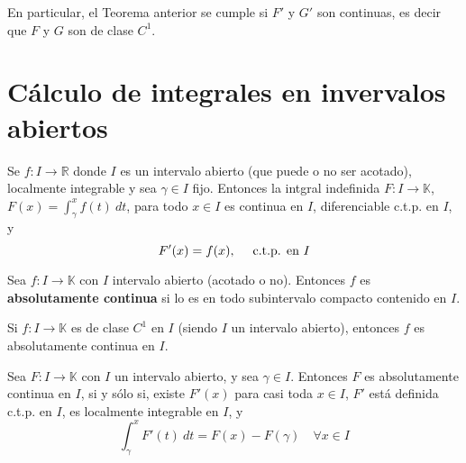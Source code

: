 \documentclass[12pt]{report}
\theoremstyle{largebreak}
\newcommand\cf[3]{\ensuremath{#1:#2\rightarrow#3}}
\begin{document}
	\begin{obs}
		En particular, el Teorema anterior se cumple si $F'$ y $G'$ son continuas, es decir que $F$ y $G$ son de clase $C^1$.
	\end{obs}
	
	\section{Cálculo de integrales en invervalos abiertos}

	\begin{theor}
		Se $\cf{f}{I}{\mathbb{R}}$ donde $I$ es un intervalo abierto (que puede o no ser acotado), localmente integrable y sea $\gamma\in I$ fijo.
		Entonces la intgral indefinida $\cf{F}{I}{\mathbb{K}}$, $F(x)=\int_{{\gamma}}^{{x}} {f(t)} \: d{t}$, para todo $x\in I$ es continua en $I$, diferenciable c.t.p. en $I$, y
		\begin{equation*}
			F'(x)=f(x),\quad\textup{ c.t.p. en }I
		\end{equation*}
		
	\end{theor}

	\begin{cor}
			
	\end{cor}
	

	\begin{mydef}
		Sea $\cf{f}{I}{\mathbb{K}}$ con $I$ intervalo abierto (acotado o no). Entonces $f$ es \textbf{absolutamente continua} si lo es en todo subintervalo compacto contenido en $I$.
	\end{mydef}
	
	\begin{propo}
		Si $\cf{f}{I}{\mathbb{K}}$ es de clase $C^1$ en $I$ (siendo $I$ un intervalo abierto), entonces $f$ es absolutamente continua en $I$.
	\end{propo}
	
	\begin{theor}
	Sea $\cf{F}{I}{\mathbb{K}}$ con $I$ un intervalo abierto, y sea $\gamma\in I$. Entonces $F$	es absolutamente continua en $I$, si y sólo si, existe $F'(x)$ para casi toda $x\in I$, $F'$ está definida c.t.p. en $I$, es localmente integrable en $I$, y
	\begin{equation*}
		\int_{{\gamma}}^{{x}} {F'(t)} \: d{t}={F(x)-F(\gamma)\quad \forall x\in I}
	\end{equation*}
	
	\end{theor}

	\begin{theor}
		
	\end{theor}
	

	\begin{theor}
		
	\end{theor}
	
\end{document}
